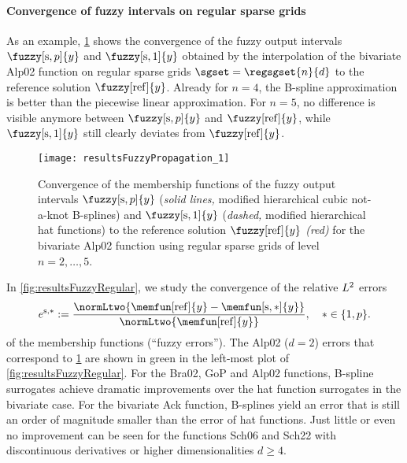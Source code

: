 \paragraph{Convergence of fuzzy intervals on regular sparse grids}

As an example,
\cref{fig:resultsFuzzyPropagation} shows the convergence of the
fuzzy output intervals $\fuzzy[\sparse,p]{y}$ and $\fuzzy[\sparse,1]{y}$
obtained by the interpolation of the
bivariate Alp02 function on regular sparse grids $\sgset = \regsgset{n}{d}$
to the reference solution $\fuzzy[\reference]{y}$.
Already for $n = 4$, the B-spline approximation is better than the
piecewise linear approximation.
For $n = 5$, no difference is visible anymore between $\fuzzy[\sparse,p]{y}$
and $\fuzzy[\reference]{y}$, while $\fuzzy[\sparse,1]{y}$ still clearly
deviates from $\fuzzy[\reference]{y}$.

\begin{SCfigure}
  \texttt{[image: resultsFuzzyPropagation\_1]}%
  \caption[Convergence of fuzzy output intervals]{%
    Convergence of the membership functions of the fuzzy output intervals
    $\fuzzy[\sparse,p]{y}$
    (\emph{solid lines,} modified hierarchical cubic not-a-knot B-splines)
    and $\fuzzy[\sparse,1]{y}$
    (\emph{dashed,} modified hierarchical hat functions)
    to the reference solution $\fuzzy[\reference]{y}$
    \emph{\textcolor{C1}{(red)}} for the bivariate Alp02 function using
    regular sparse grids of level $n = 2, \dotsc, 5$.%
  }%
  \label{fig:resultsFuzzyPropagation}%
\end{SCfigure}

In \cref{fig:resultsFuzzyRegular}, we study the convergence of the
relative $L^2$ errors
\begin{equation}
  e^{\sparse,\ast}
  := \frac{
    \normLtwo{\memfun[\reference]{y} - \memfun[\sparse,\ast]{y}}
  }{
    \normLtwo{\memfun[\reference]{y}}
  },\quad
  \ast \in \{1, p\}.
\end{equation}
of the membership functions (``fuzzy errors'').
The Alp02 ($d = 2$) errors
that correspond to \cref{fig:resultsFuzzyPropagation}
are shown in green in the left-most plot of \cref{fig:resultsFuzzyRegular}.
For the Bra02, GoP\punctfix{,} and Alp02 functions,
B-spline surrogates achieve
dramatic improvements over the hat function surrogates in the bivariate case.
For the bivariate Ack function, B-splines yield an error that
is still an order of magnitude smaller than the error of hat functions.
Just little or even no improvement can be seen
for the functions Sch06 and Sch22 with discontinuous derivatives or
higher dimensionalities $d \ge 4$.

